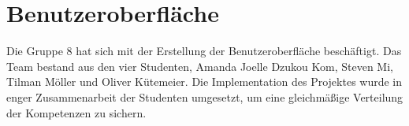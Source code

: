 \documentclass[a4paper,12pt,twoside]{book}
\begin{document}
\chapter{Benutzeroberfläche}
Die Gruppe 8 hat sich mit der Erstellung der Benutzeroberfläche beschäftigt. Das Team bestand aus den vier Studenten, Amanda Joelle Dzukou Kom, Steven Mi, Tilman Möller und Oliver Kütemeier. Die Implementation des Projektes wurde in enger Zusammenarbeit der Studenten umgesetzt, um eine gleichmäßige Verteilung der Kompetenzen zu sichern. 







\setcounter{page}{6}

\printbibliography[title={Literaturverzeichnis}]
\newpage

\printglossaries
{}
\newpage
\end{document}
